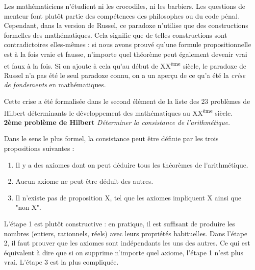 \documentclass[12pt, a4paper]{article}
\newtheorem*{problem}{Problème}
\begin{document}
Les mathématiciens n'étudient ni les crocodiles, ni les barbiers.
Les questions de menteur font plutôt partie des compétences des philosophes ou du code pénal.
Cependant, dans la version de Russel, ce paradoxe n'utilise que des constructions formelles des mathématiques. Cela signifie que de telles constructions sont contradictoires elles-mêmes : si nous avons prouvé qu'une formule propositionnelle est à la fois vraie et fausse, n'importe quel théorème peut également devenir vrai et faux à la fois.
Si on ajoute à cela qu'au début de XX\textsuperscript{ème} siècle, le paradoxe de Russel n'a pas été le seul paradoxe connu, on a un aperçu de ce qu'a été la \emph{crise de fondements} en mathématiques.

Cette crise a été formalisée dans le second élément de la liste des 23 problèmes de Hilbert déterminants le développement des mathématiques au XX\textsuperscript{ème} siècle. \\
\textbf{2ème problème de Hilbert}
\textit{Déterminer la consistance de l'arithmétique.}

Dans le sens le plus formel, la consistance peut être définie par les trois propositions suivantes :

\begin{enumerate}
	\item Il y a des axiomes dont on peut déduire tous les théorèmes de l'arithmétique.
	\item Aucun axiome ne peut être déduit des autres.
	\item Il n'existe pas de proposition X, tel que les axiomes impliquent X ainsi que "non X".
\end{enumerate}

L'étape 1 est plutôt constructive : en pratique, il est suffisant de produire les nombres (entiers, rationnels, réels) avec leurs propriétés habituelles.
Dans l'étape 2, il faut prouver que les axiomes sont indépendants les uns des autres.
Ce qui est équivalent à dire que si on supprime n'importe quel axiome, l'étape 1 n'est plus vrai.
L'étape 3 est la plus compliquée.
\end{document}

